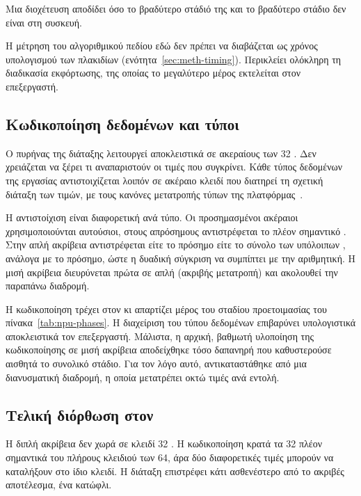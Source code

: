 Μια διοχέτευση αποδίδει όσο το βραδύτερο στάδιό της και το βραδύτερο στάδιο δεν
είναι στη συσκευή.

Η μέτρηση του αλγοριθμικού πεδίου εδώ δεν πρέπει να διαβάζεται ως χρόνος
υπολογισμού των πλακιδίων (ενότητα~\ref{sec:meth-timing}). Περικλείει ολόκληρη
τη διαδικασία εκφόρτωσης, της οποίας το μεγαλύτερο μέρος εκτελείται στον
επεξεργαστή.



\subsection{Κωδικοποίηση δεδομένων και τύποι}
\label{sec:npu-encoding}

Ο πυρήνας της διάταξης λειτουργεί αποκλειστικά σε ακεραίους των 32 .
Δεν χρειάζεται να ξέρει τι αναπαριστούν οι τιμές που συγκρίνει. Κάθε τύπος
δεδομένων της εργασίας αντιστοιχίζεται λοιπόν σε ακέραιο κλειδί που διατηρεί τη
σχετική διάταξη των τιμών, με τους κανόνες μετατροπής τύπων της
πλατφόρμας~\cite{amd2024ug1079}.

Η αντιστοίχιση είναι διαφορετική ανά τύπο. Οι προσημασμένοι ακέραιοι
χρησιμοποιούνται αυτούσιοι, στους απρόσημους αντιστρέφεται το πλέον σημαντικό
. Στην απλή ακρίβεια αντιστρέφεται είτε το πρόσημο είτε το σύνολο των
υπόλοιπων , ανάλογα με το πρόσημο, ώστε η δυαδική σύγκριση να συμπίπτει
με την αριθμητική. Η μισή ακρίβεια διευρύνεται πρώτα σε απλή (ακριβής
μετατροπή) και ακολουθεί την παραπάνω διαδρομή.

Η κωδικοποίηση τρέχει στον  κι απαρτίζει μέρος του σταδίου
προετοιμασίας του πίνακα~\ref{tab:npu-phases}. Η διαχείριση του τύπου δεδομένων
επιβαρύνει υπολογιστικά αποκλειστικά τον επεξεργαστή. Μάλιστα, η αρχική,
βαθμωτή υλοποίηση της κωδικοποίησης σε μισή ακρίβεια αποδείχθηκε τόσο δαπανηρή
που καθυστερούσε αισθητά το συνολικό στάδιο. Για τον λόγο αυτό, αντικαταστάθηκε
από μια διανυσματική διαδρομή, η οποία μετατρέπει οκτώ τιμές ανά εντολή.

\subsection{Τελική διόρθωση στον }
\label{sec:npu-refinement}

Η διπλή ακρίβεια δεν χωρά σε κλειδί 32 . Η κωδικοποίηση κρατά τα 32
πλέον σημαντικά  του πλήρους κλειδιού των 64, άρα δύο διαφορετικές
τιμές μπορούν να καταλήξουν στο ίδιο κλειδί. Η διάταξη επιστρέφει κάτι
ασθενέστερο από το ακριβές αποτέλεσμα, ένα κατώφλι.

